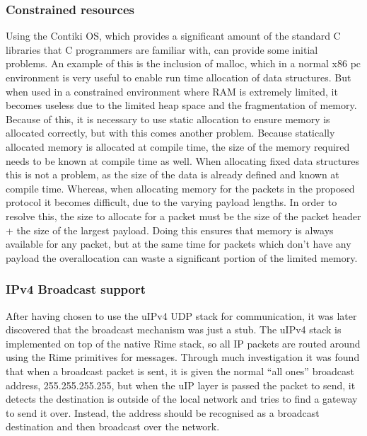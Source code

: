 \subsubsection{Constrained resources} %
\label{ssub:constrained_resources}
Using the Contiki OS, which provides a significant amount of the standard C libraries that C programmers are familiar with, can provide some initial problems. An example of this is the inclusion of malloc, which in a normal x86 pc environment is very useful to enable run time allocation of data structures. But when used in a constrained environment where RAM is extremely limited, it becomes useless due to the limited heap space and the fragmentation of memory. Because of this, it is necessary to use static allocation to ensure memory is allocated correctly, but with this comes another problem. Because statically allocated memory is allocated at compile time, the size of the memory required needs to be known at compile time as well. When allocating fixed data structures this is not a problem, as the size of the data is already defined and known at compile time. Whereas, when allocating memory for the packets in the proposed protocol it becomes difficult, due to the varying payload lengths. In order to resolve this, the size to allocate for a packet must be the size of the packet header + the size of the largest payload. Doing this ensures that memory is always available for any packet, but at the same time for packets which don't have any payload the overallocation can waste a significant portion of the limited memory.  

\subsubsection{IPv4 Broadcast support} %
\label{sub:ipv4_broadcast_support}
After having chosen to use the uIPv4 UDP stack for communication, it was later discovered that the broadcast mechanism was just a stub.
The uIPv4 stack is implemented on top of the native Rime stack, so all IP packets are routed around using the Rime primitives for messages. Through much investigation it was found that when a broadcast packet is sent, it is given the normal ``all ones'' broadcast address, 255.255.255.255, but when the uIP layer is passed the packet to send, it detects the destination is outside of the local network and tries to find a gateway to send it over. Instead, the address should be recognised as a broadcast destination and then broadcast over the network.

